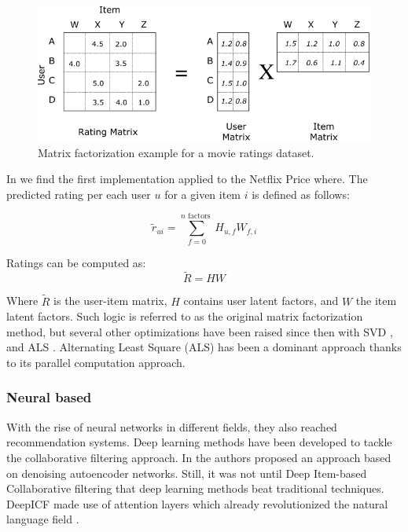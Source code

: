 \documentclass{kththesis}
\begin{document}
\begin{figure}[H]
    \centering
    \includegraphics[width=\textwidth]{matrix_factorization.png}
    \caption{Matrix factorization example for a movie ratings dataset.}
\end{figure}

In \cite{matrixvanilla} we find the first implementation applied to the Netflix Price where. The predicted rating per each user $u$ for a given item $i$ is defined as follows:

\begin{equation}
    \tilde{r}_{u i}=\sum_{f=0}^{n \text { factors }} H_{u, f} W_{f, i}
\end{equation}

Ratings can be computed as:
\begin{equation}
    \tilde{R}=H W
\end{equation}

Where $\tilde{R}$ is the user-item matrix, $H$ contains user latent factors, and $W$ the item latent factors. Such logic is referred to as the original matrix factorization method, but several other optimizations have been raised since then with SVD \cite{svd}, and ALS \cite{alsnetflix}. Alternating Least Square (ALS) has been a dominant approach thanks to its parallel computation approach.


\subsubsection{Neural based}
With the rise of neural networks in different fields, they also reached recommendation systems\cite{neuralonrecommendations}. Deep learning methods have been developed to tackle the collaborative filtering approach. In \cite{wang2015collaborative} the authors proposed an approach based on denoising autoencoder networks. Still, it was not until Deep Item-based Collaborative filtering \cite{deepicf} that deep learning methods beat traditional techniques. DeepICF made use of attention layers which already revolutionized the natural language field \cite{attention}. 
\end{document}
